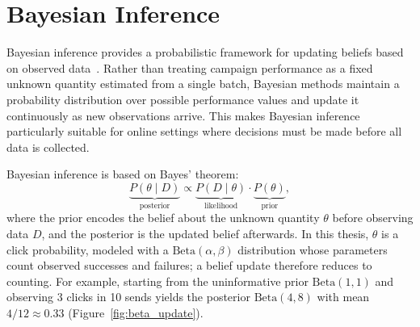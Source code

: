

\section{Bayesian Inference}

Bayesian inference provides a probabilistic framework for updating beliefs based on observed data~\cite{scott2010modern}. Rather than treating campaign performance as a fixed unknown quantity estimated from a single batch, Bayesian methods maintain a probability distribution over possible performance values and update it continuously as new observations arrive. This makes Bayesian inference particularly suitable for online settings where decisions must be made before all data is collected.

Bayesian inference is based on Bayes' theorem:
\begin{equation}
    \underbrace{P(\theta \mid D)}_{\text{posterior}}
    \propto
    \underbrace{P(D \mid \theta)}_{\text{likelihood}} \cdot
    \underbrace{P(\theta)}_{\text{prior}},
\end{equation}
where the prior encodes the belief about the unknown quantity $\theta$ before observing data $D$, and the posterior is the updated belief afterwards. In this thesis, $\theta$ is a click probability, modeled with a $\mathrm{Beta}(\alpha,\beta)$ distribution whose parameters count observed successes and failures; a belief update therefore reduces to counting. For example, starting from the uninformative prior $\mathrm{Beta}(1,1)$ and observing 3 clicks in 10 sends yields the posterior $\mathrm{Beta}(4,8)$ with mean $4/12 \approx 0.33$ (Figure~\ref{fig:beta_update}).

